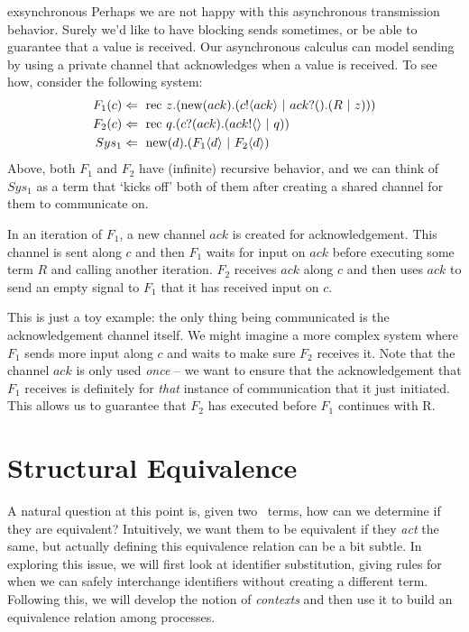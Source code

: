 \begin{example}{exsynchronous}
	 Perhaps we are not happy with this asynchronous transmission behavior.  
Surely we'd like to have blocking sends sometimes, or be able to guarantee that a value is received.  
Our asynchronous calculus can model  sending by using a private channel that acknowledges when a value is received.  
To see how, consider the following system:
	\begin{align}
		F_1(c) & \Leftarrow\  \text{rec }{z}. (\text{new}({ack}).({c}!\langle{ack}\rangle \ |\  {ack}?({}).(R \ |\  z)))\\
		F_2(c) & \Leftarrow\  \text{rec }{q}. ({c}?({ack}).({ack}!\langle{}\rangle \ |\  q)) \\
		Sys_1 & \Leftarrow\  \text{new}({d}).(F_1\langle d \rangle \ |\  F_2\langle d\rangle)
	\end{align}
	Above, both $F_1$ and $F_2$ have (infinite) recursive behavior, and we can think of $Sys_1$ as a term that `kicks off' both of them after creating a shared channel for them to communicate on.  

	
	In an iteration of $F_1$, a new channel $ack$ is created for acknowledgement.  
This channel is sent along $c$ and then $F_1$ waits for input on $ack$ before executing some term $R$ and calling another iteration.  
$F_2$ receives $ack$ along $c$ and then uses $ack$ to send an empty signal to $F_1$ that it has received input on $c$.  

	
	This is just a toy example: the only thing being communicated is the acknowledgement channel itself.  
We might imagine a more complex system where $F_1$ sends more input along $c$ and waits to make sure $F_2$ receives it.  
Note that the channel $ack$ is only used \emph{once} -- we want to ensure that the acknowledgement that $F_1$ receives is definitely for \emph{that} instance of communication that it just initiated.  
This allows us to guarantee that $F_2$ has executed before $F_1$ continues with R.  
\end{example}

\section{Structural Equivalence}
	A natural question at this point is, given two \picalc\ terms, how can we determine if they are equivalent?  Intuitively, we want them to be equivalent if they \emph{act} the same, but actually defining this equivalence relation can be a bit subtle.  
In exploring this issue, we will first look at identifier substitution, giving rules for when we can safely interchange identifiers without creating a different term. 
Following this, we will develop the notion of \emph{contexts} and then use it to build an equivalence relation among processes.
